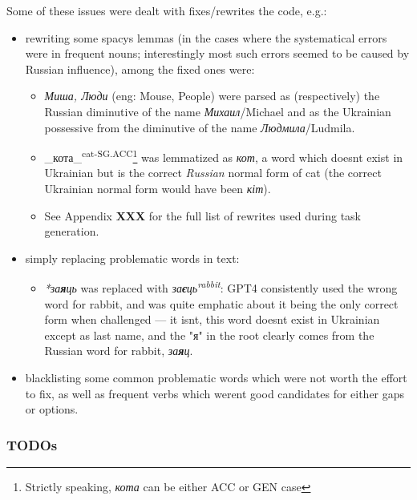 Some of these issues were dealt with fixes/rewrites the code, e.g.:

\begin{itemize}
\tightlist
\item
  rewriting some spacy\textquotesingle s lemmas (in the cases where the
  systematical errors were in frequent nouns; interestingly most such
  errors seemed to be caused by Russian influence), among the fixed ones
  were:

  \begin{itemize}
  \tightlist
  \item
    \emph{Миша, Люди} (eng: Mouse, People) were parsed as (respectively)
    the Russian diminutive of the name \emph{Михаил}/Michael and as the
    Ukrainian possessive from the diminutive of the name
    \emph{Людмила}/Ludmila.
  \item
    \_кота\_\textsuperscript{cat-SG.ACC}\footnote{Strictly speaking,
      \emph{кота} can be either ACC or GEN case} was lemmatized as \emph{кот}, a word which
    doesn\textquotesingle t exist in Ukrainian but is the correct
    \emph{Russian} normal form of \textquotesingle cat\textquotesingle{}
    (the correct Ukrainian normal form would have been \emph{кіт}).
  \item
    See Appendix \textbf{XXX} for the full list of rewrites used during
    task generation.
  \end{itemize}
\item
  simply replacing problematic words in text:

  \begin{itemize}
  \tightlist
  \item
    \emph{*за\textbf{я}ць} was replaced with
    \emph{за\textbf{є}ць\textsuperscript{rabbit}}: GPT4 consistently used the
    wrong word for rabbit, and was quite emphatic about it being the
    only correct form when challenged --- it isn\textquotesingle t, this
    word doesn\textquotesingle t exist in Ukrainian except as last name,
    and the "я" in the root clearly comes from the Russian word for
    rabbit, \emph{за\textbf{я}ц}.
  \end{itemize}
\item
  blacklisting some common problematic words which were not worth the
  effort to fix, as well as frequent verbs which weren\textquotesingle t
  good candidates for either gaps or options.
\end{itemize}

\subsubsection{TODOs}\label{todos}

